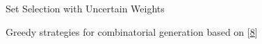 

\begin{cvtalks}
  \cvtalk
  {Set Selection with Uncertain Weights \vspace{-5mm}}
  {}
  {\begin{cvitems}
      \item {} \hfill {}
    \end{cvitems}}
  


  \cvtalk
  {Greedy strategies for combinatorial generation \vspace{-5mm}}
  {based on [\hyperlink{paper8}{8}]}
  {
    \begin{cvitems}
      \item {} \hfill {}
    \end{cvitems}
  }

  \vspace{5mm}
\end{cvtalks}